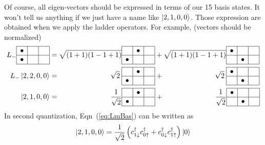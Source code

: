 Of course, all eigen-vectors should be expressed in terms of our 15 basis states. It won't
tell us anything if we just have a name like $\Ket{2,1,0,0}$. Those expression are
obtained when we apply the ladder operators. For example, (vectors should be normalized)
\begin{align} \label{eq:LmBas}
L_-
\begin{array}{|c|c|c|}
\hline
\bullet & \phantom{\bullet} & \phantom{\bullet} \\ \hline
\bullet &  &  \\
\hline
\end{array} & =
\sqrt{(1+1)(1-1+1)}
\begin{array}{|c|c|c|}
\hline
\phantom{\bullet} & \bullet & \phantom{\bullet} \\ \hline
\bullet &  &  \\
\hline
\end{array} +
\sqrt{(1+1)(1-1+1)}
\begin{array}{|c|c|c|}
\hline
\bullet & \phantom{\bullet} & \phantom{\bullet} \\ \hline
 & \bullet &  \\
\hline
\end{array} \nonumber \\
L_-\Ket{2,2,0,0} & = \qquad \qquad \qquad \quad \,
\sqrt{2}\:
\begin{array}{|c|c|c|}
\hline
\phantom{\bullet} & \bullet & \phantom{\bullet} \\ \hline
\bullet &  &  \\
\hline
\end{array} + \qquad \qquad \qquad \quad \,
\sqrt{2}\:
\begin{array}{|c|c|c|}
\hline
\bullet & \phantom{\bullet} & \phantom{\bullet} \\ \hline
 & \bullet &  \\
\hline
\end{array} \nonumber \\
\Ket{2,1,0,0} & = \qquad \qquad \qquad \quad \,
\frac{1}{\sqrt{2}}
\begin{array}{|c|c|c|}
\hline
\phantom{\bullet} & \bullet & \phantom{\bullet} \\ \hline
\bullet &  &  \\
\hline
\end{array} + \qquad \qquad \qquad \quad \,
\frac{1}{\sqrt{2}}
\begin{array}{|c|c|c|}
\hline
\bullet & \phantom{\bullet} & \phantom{\bullet} \\ \hline
 & \bullet &  \\
\hline
\end{array}
\end{align}
%
In second quantization, Eqn~(\ref{eq:LmBas}) can be written as
\begin{equation}
\Ket{2,1,0,0} =
\frac{1}{\sqrt{2}} \left( c_{1\downarrow}^\dagger c_{0\uparrow}^\dagger
+ c_{0\downarrow}^\dagger c_{1\uparrow}^\dagger \right) \Ket{0}
\end{equation}
\vspace{1em}

